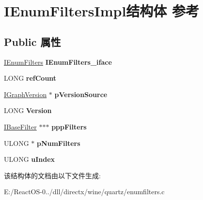 \hypertarget{struct_i_enum_filters_impl}{}\section{I\+Enum\+Filters\+Impl结构体 参考}
\label{struct_i_enum_filters_impl}
\subsection*{Public 属性}
\begin{DoxyCompactItemize}
\item 
\mbox{\label{struct_i_enum_filters_impl_a188d74fcb2af65a09ce4732960fe9bd8}} 
\hyperlink{interface_i_enum_filters}{I\+Enum\+Filters} {\bfseries I\+Enum\+Filters\+\_\+iface}
\item 
\mbox{\label{struct_i_enum_filters_impl_a39c1a052c97b685f8083efa58ce1f386}} 
L\+O\+NG {\bfseries ref\+Count}
\item 
\mbox{\label{struct_i_enum_filters_impl_abe9dce7fe0577f15b656e0ddc6449887}} 
\hyperlink{interface_i_graph_version}{I\+Graph\+Version} $\ast$ {\bfseries p\+Version\+Source}
\item 
\mbox{\label{struct_i_enum_filters_impl_ac4f5e413e487ea02494009ae5e6d9796}} 
L\+O\+NG {\bfseries Version}
\item 
\mbox{\label{struct_i_enum_filters_impl_a57a19fbe45bf4e0c52a56ab862e23832}} 
\hyperlink{interface_i_base_filter}{I\+Base\+Filter} $\ast$$\ast$$\ast$ {\bfseries ppp\+Filters}
\item 
\mbox{\label{struct_i_enum_filters_impl_a2ffdc3d90fbd9e7201558b6201ad4470}} 
U\+L\+O\+NG $\ast$ {\bfseries p\+Num\+Filters}
\item 
\mbox{\label{struct_i_enum_filters_impl_ad3f3e91b2f76a07df1ae6ffa45e3449b}} 
U\+L\+O\+NG {\bfseries u\+Index}
\end{DoxyCompactItemize}


该结构体的文档由以下文件生成\+:\begin{DoxyCompactItemize}
\item 
E\+:/\+React\+O\+S-\/0../dll/directx/wine/quartz/enumfilters.\+c\end{DoxyCompactItemize}
